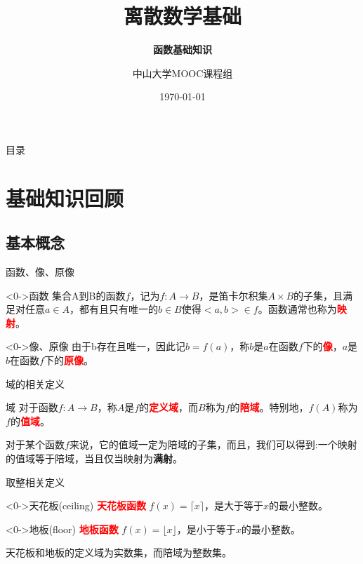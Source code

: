 \documentclass[10pt,aspectratio=43,mathserif,table]{beamer}
\title{离散数学基础}
\subtitle{\fontsize{9pt}{14pt}\textbf{函数基础知识}}
\author{中山大学MOOC课程组}
\institute{\fontsize{8pt}{14pt}中山大学计算机学院}
\date{\today}
\begin{document}

\frame{\titlepage}

\section[目录]{}   %
\begin{frame}{目录}
\tableofcontents
\end{frame}

\section{基础知识回顾}

\subsection{基本概念}

\begin{frame}{函数、像、原像}
	\begin{block}<0->{函数}
		集合A到B的函数$f$，记为$f:A\rightarrow B$，是笛卡尔积集$A\times B$的子集，且满足对任意$a\in A$，都有且只有唯一的$b\in B$使得$<a,b>\in f$。函数通常也称为\textcolor{red}{\textbf{映射}}。
	\end{block}

	\begin{block}<0->{像、原像}
		由于b存在且唯一，因此记$b=f(a)$，称$b$是$a$在函数$f$下的\textcolor{red}{\textbf{像}}，$a$是$b$在函数$f$下的\textcolor{red}{\textbf{原像}}。
	\end{block}
\end{frame}

\begin{frame}{域的相关定义}
	\begin{block}{域}
		对于函数$f:A\rightarrow B$，称$A$是$f$的\textcolor{red}{\textbf{定义域}}，而$B$称为$f$的\textcolor{red}{\textbf{陪域}}。特别地，$f(A)$称为$f$的\textcolor{red}{\textbf{值域}}。
	\end{block}
	
	\textcolor{mymauve}{对于某个函数$f$来说，它的值域一定为陪域的子集，而且，我们可以得到:一个映射的值域等于陪域，当且仅当映射为\textbf{满射}。}

\end{frame}

\begin{frame}{取整相关定义}
	\begin{block}<0->{天花板(ceiling)}
		\textcolor{red}{\textbf{天花板函数}} $f(x) = \lceil x \rceil$，是大于等于$x$的最小整数。
	\end{block}
	
	\begin{block}<0->{地板(floor)}
		\textcolor{red}{\textbf{地板函数}} $f(x) = \lfloor x \rfloor$，是小于等于$x$的最小整数。
	\end{block}

	\textcolor{mymauve}{天花板和地板的定义域为实数集，而陪域为整数集。}
\end{frame}
\end{document}
